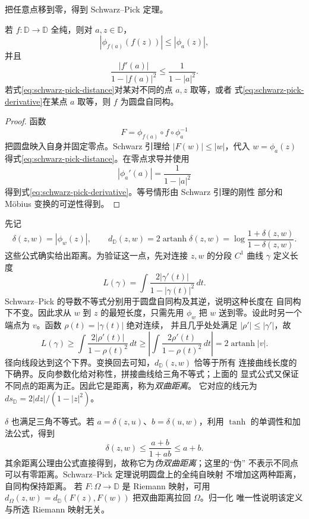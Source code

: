把任意点移到零，得到 Schwarz--Pick 定理。

\begin{theorem}\label{thm:schwarz-pick}
若 $f:\mathbb D\to\mathbb D$ 全纯，则对 $a,z\in\mathbb D$，
\begin{equation}\label{eq:schwarz-pick-distance}
 |\phi_{f(a)}(f(z))|\le|\phi_a(z)|,
\end{equation}
并且
\begin{equation}\label{eq:schwarz-pick-derivative}
 \frac{|f'(a)|}{1-|f(a)|^2}\le\frac1{1-|a|^2}.
\end{equation}
若式\eqref{eq:schwarz-pick-distance}对某对不同的点 $a,z$ 取等，或者
式\eqref{eq:schwarz-pick-derivative}在某点 $a$ 取等，则 $f$ 为圆盘自同构。
\end{theorem}

\begin{proof}
函数
\[
 F=\phi_{f(a)}\circ f\circ\phi_a^{-1}
\]
把圆盘映入自身并固定零点。Schwarz 引理给 $|F(w)|\le|w|$，代入
$w=\phi_a(z)$ 得式\eqref{eq:schwarz-pick-distance}。在零点求导并使用
\[
 |\phi_a'(a)|=\frac1{1-|a|^2}
\]
得到式\eqref{eq:schwarz-pick-derivative}。等号情形由 Schwarz 引理的刚性
部分和 M\"obius 变换的可逆性得到。
\end{proof}

先记
\[
 \delta(z,w)=|\phi_w(z)|,
 \qquad
 d_{\mathbb D}(z,w)=2\operatorname{artanh}\delta(z,w)
 =\log\frac{1+\delta(z,w)}{1-\delta(z,w)}.
\]
这些公式确实给出距离。为验证这一点，先对连接 $z,w$ 的分段 $C^1$ 曲线
$\gamma$ 定义长度
\[
 L(\gamma)=\int\frac{2|\gamma'(t)|}{1-|\gamma(t)|^2}\,dt.
\]
Schwarz--Pick 的导数不等式分别用于圆盘自同构及其逆，说明这种长度在
自同构下不变。因此求从 $w$ 到 $z$ 的最短长度，只需先用 $\phi_w$ 把
$w$ 送到零。设此时另一个端点为 $v$。函数 $\rho(t)=|\gamma(t)|$ 绝对连续，
并且几乎处处满足 $|\rho'|\le|\gamma'|$，故
\[
 L(\gamma)\ge\int\frac{2|\rho'(t)|}{1-\rho(t)^2}\,dt
 \ge\left|\int\frac{2\rho'(t)}{1-\rho(t)^2}\,dt\right|
 =2\operatorname{artanh}|v|.
\]
径向线段达到这个下界。变换回去可知，$d_{\mathbb D}(z,w)$ 恰等于所有
连接曲线长度的下确界。反向参数化给对称性，拼接曲线给三角不等式；上面的
显式公式又保证不同点的距离为正。因此它是距离，称为\emph{双曲距离}。
它对应的线元为 $ds_{\mathbb D}=2|dz|/(1-|z|^2)$。

$\delta$ 也满足三角不等式。若 $a=\delta(z,u)$、$b=\delta(u,w)$，利用
$\tanh$ 的单调性和加法公式，得到
\[
 \delta(z,w)\le\frac{a+b}{1+ab}\le a+b.
\]
其余距离公理由公式直接得到，故称它为\emph{伪双曲距离}；这里的“伪”
不表示不同点可以有零距离。Schwarz--Pick 定理说明圆盘上的全纯自映射
不增加这两种距离，自同构保持距离。
若 $F:\Omega\to\mathbb D$ 是 Riemann 映射，可用
$d_\Omega(z,w)=d_{\mathbb D}(F(z),F(w))$ 把双曲距离拉回 $\Omega$。归一化
唯一性说明该定义与所选 Riemann 映射无关。


